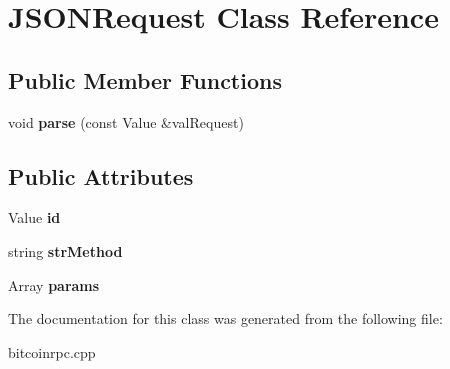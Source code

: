 \hypertarget{class_j_s_o_n_request}{}\section{J\+S\+O\+N\+Request Class Reference}
\label{class_j_s_o_n_request}
\subsection*{Public Member Functions}
\begin{DoxyCompactItemize}
\item 
\mbox{\label{class_j_s_o_n_request_a5c68b21e7f1bead9fd39f27208446add}} 
void {\bfseries parse} (const Value \&val\+Request)
\end{DoxyCompactItemize}
\subsection*{Public Attributes}
\begin{DoxyCompactItemize}
\item 
\mbox{\label{class_j_s_o_n_request_a511230ee04a067551bafd1ccd9462237}} 
Value {\bfseries id}
\item 
\mbox{\label{class_j_s_o_n_request_ace58495b259be69fb4b6e256a42c9d5f}} 
string {\bfseries str\+Method}
\item 
\mbox{\label{class_j_s_o_n_request_a92b1bcc9caa57cec01ccdb498a2b3666}} 
Array {\bfseries params}
\end{DoxyCompactItemize}


The documentation for this class was generated from the following file\+:\begin{DoxyCompactItemize}
\item 
bitcoinrpc.\+cpp\end{DoxyCompactItemize}
